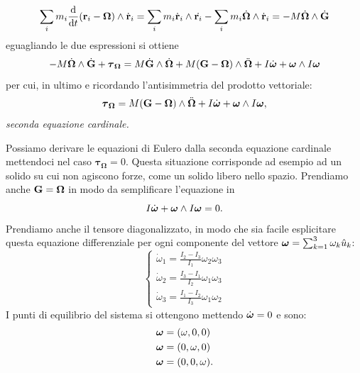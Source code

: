     \begin{equation}
        \sum_i m_i\frac{\mathrm{d}}{\mathrm{d}t}(\mathbf{r}_i-\boldsymbol{\Omega})\wedge\dot{\mathbf{r}}_i = \sum_i m_i \dot{\mathbf{r}}_i\wedge \dot{\mathbf{r}_i} -\sum_i m_i\dot{\boldsymbol{\Omega}}\wedge\dot{\mathbf{r}}_i =-M\dot{\boldsymbol{\Omega}}\wedge \dot{\mathbf{G}}
    \end{equation}
    eguagliando le due espressioni si ottiene
    \begin{equation}
       - M\dot{\boldsymbol{\Omega}}\wedge \dot{\mathbf{G}}+\boldsymbol{\tau}_{\boldsymbol{\Omega}} = M\dot{\mathbf{G}}\wedge\dot{\boldsymbol{\Omega}} + M(\mathbf{G}-\boldsymbol{\Omega})\wedge\ddot{\boldsymbol{\Omega}} + I\dot{\boldsymbol{\omega}}+\boldsymbol{\omega}\wedge I\boldsymbol{\omega}
    \end{equation}
    per cui, in ultimo e ricordando l'antisimmetria del prodotto vettoriale:
    \begin{equation}
        \boldsymbol{\tau}_{\boldsymbol{\Omega}}=M(\mathbf{G}-\boldsymbol{\Omega})\wedge\ddot{\boldsymbol{\Omega}} + I\dot{\boldsymbol{\omega}}+\boldsymbol{\omega}\wedge I\boldsymbol{\omega},
    \end{equation}
    \emph{seconda equazione cardinale.}

    Possiamo derivare le equazioni di Eulero dalla seconda equazione cardinale mettendoci nel caso $\boldsymbol{\tau}_{\boldsymbol{\Omega}}=0$. Questa situazione corrisponde ad esempio ad un solido su cui non agiscono forze, come un solido libero nello spazio. Prendiamo anche $\mathbf{G} = \boldsymbol{\Omega}$ in modo da semplificare l'equazione in
    \begin{equation}
        I\dot{\boldsymbol{\omega}}+\boldsymbol{\omega}\wedge I\boldsymbol{\omega} =0.
    \end{equation}
    Prendiamo anche il tensore diagonalizzato, in modo che sia facile esplicitare questa equazione differenziale per ogni componente del vettore $\boldsymbol{\omega} = \sum_{k=1}^3 \omega_k\hat{u}_k$:
    \begin{equation}
        \begin{cases}
            \dot{\omega}_1 = \frac{I_2-I_3}{I_1}\omega_2\omega_3\\
            \dot{\omega}_2 = \frac{I_3-I_1}{I_2}\omega_1\omega_3\\
            \dot{\omega}_3 = \frac{I_1-I_2}{I_3}\omega_1\omega_2
        \end{cases}
    \end{equation}
    I punti di equilibrio del sistema si ottengono mettendo $\dot{\boldsymbol{\omega}}=0$ e sono:
    \begin{equation}
        \begin{aligned}
            &\boldsymbol{\omega} = (\omega,0,0)\\
            &\boldsymbol{\omega} = (0,\omega,0)\\
            &\boldsymbol{\omega} = (0,0,\omega).
        \end{aligned}
    \end{equation}
